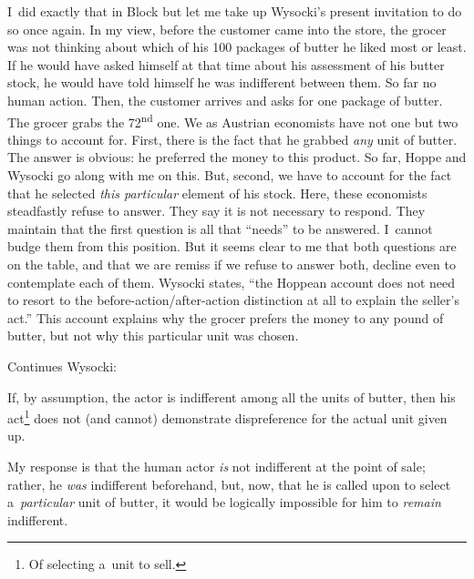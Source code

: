 I~did exactly that in Block 
\parencites*[][]{block_robert_1980}[][]{block_rejoinder_2009}[][]{block_rejoinder_2009-1}[][]{block_response_2012}[][]{block_rejoinder_2019}[][]{block_response_2022} %
 but let me take up Wysocki's present invitation to do so once again. In my view, before the customer came into the store, the grocer was not thinking about which of his 100 packages of butter he liked most or least. If he would have asked himself at that time about his assessment of his butter stock, he would have told himself he was indifferent between them. So far no human action. Then, the customer arrives and asks for one package of butter. The grocer grabs the 72\textsuperscript{nd} one. We as Austrian economists have not one but two things to account for. First, there is the fact that he grabbed \textit{any} unit of butter. The answer is obvious: he preferred the money to this product. So far, Hoppe and Wysocki go along with me on this. But, second, we have to account for the fact that he selected \textit{this particular} element of his stock. Here, these economists steadfastly refuse to answer. They say it is not necessary to respond. They maintain that the first question is all that ``needs'' to be answered. I~cannot budge them from this position. But it seems clear to me that both questions are on the table, and that we are remiss if we refuse to answer both, decline even to contemplate each of them. Wysocki states, ``the Hoppean account does not need to resort to the before-action/after-action distinction at all to explain the seller's act.'' This account explains why the grocer prefers the money to any pound of butter, but not why this particular unit was chosen.



Continues Wysocki:



If, by assumption, the actor is indifferent among all the units of butter, then his act\footnote{Of selecting a~unit to sell.} does not (and cannot) demonstrate dispreference for the actual unit given up.



My response is that the human actor \textit{is} not indifferent at the point of sale; rather, he \textit{was} indifferent beforehand, but, now, that he is called upon to select a~\textit{particular} unit of butter, it would be logically impossible for him to \textit{remain} indifferent.



